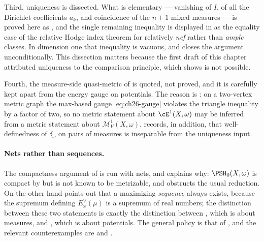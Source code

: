 Third, uniqueness is dissected.  What is elementary --- vanishing of \(I\), of
all the Dirichlet coefficients \(a_k\), and coincidence of the \(n+1\) mixed
measures --- is proved here as , and the single
remaining inequality is displayed in  as the
equality case of the relative Hodge index theorem for relatively \emph{nef}
rather than \emph{ample} classes.  In dimension one that inequality is
vacuous, and  closes the argument
unconditionally.  This dissection matters because the first draft of this
chapter attributed uniqueness to the comparison principle, which
 shows is not possible.

Fourth, the measure-side quasi-metric of
 is quoted, not proved, and it is
carefully kept apart from the energy gauge on potentials.  The reason is
: on a two-vertex metric graph the max-based
gauge \eqref{eq:ch26-gauge} violates the triangle inequality by a factor of
two, so no metric statement about \(\cE^1(X,\omega)\) may be inferred from a
metric statement about \(\mathcal M^1_V(X,\omega)\).
 records, in addition, that
well-definedness of \(\delta_\omega\) on pairs of measures is inseparable
from the uniqueness input.

\paragraph{Nets rather than sequences.}
The compactness argument of  is run with
nets, and  explains why: \(\PSH_0(X,\omega)\) is
compact by  but is not known to be metrizable,
and  obstructs the usual reduction.  On
the other hand  points out that a
maximizing \emph{sequence} always exists, because the supremum defining
\(E^\vee_\omega(\mu)\) is a supremum of real numbers; the distinction between
these two statements is exactly the distinction between
, which is about measures, and
, which is about potentials.  The general
policy is that of , and the relevant
counterexamples are  and
.

